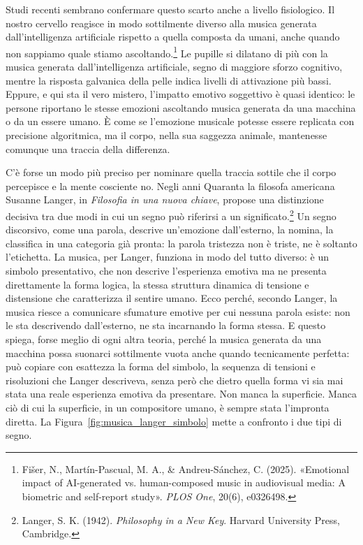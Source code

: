 Studi recenti sembrano confermare questo scarto anche a livello fisiologico. Il nostro cervello reagisce in modo sottilmente diverso alla musica generata dall'intelligenza artificiale rispetto a quella composta da umani, anche quando non sappiamo quale stiamo ascoltando.\footnote{Fi\v{s}er, N., Mart\'{i}n-Pascual, M. A., \& Andreu-S\'{a}nchez, C. (2025). «Emotional impact of AI-generated vs. human-composed music in audiovisual media: A biometric and self-report study». \textit{PLOS One}, 20(6), e0326498.} Le pupille si dilatano di pi\`{u} con la musica generata dall'intelligenza artificiale, segno di maggiore sforzo cognitivo, mentre la risposta galvanica della pelle indica livelli di attivazione pi\`{u} bassi. Eppure, e qui sta il vero mistero, l'impatto emotivo soggettivo \`{e} quasi identico: le persone riportano le stesse emozioni ascoltando musica generata da una macchina o da un essere umano. \`{E} come se l'emozione musicale potesse essere replicata con precisione algoritmica, ma il corpo, nella sua saggezza animale, mantenesse comunque una traccia della differenza.

C'\`{e} forse un modo pi\`{u} preciso per nominare quella traccia sottile che il corpo percepisce e la mente cosciente no. Negli anni Quaranta la filosofa americana Susanne Langer, in \textit{Filosofia in una nuova chiave}, propose una distinzione decisiva tra due modi in cui un segno pu\`{o} riferirsi a un significato.\footnote{Langer, S. K. (1942). \textit{Philosophy in a New Key}. Harvard University Press, Cambridge.} Un segno discorsivo, come una parola, descrive un'emozione dall'esterno, la nomina, la classifica in una categoria gi\`{a} pronta: la parola tristezza non \`{e} triste, ne \`{e} soltanto l'etichetta. La musica, per Langer, funziona in modo del tutto diverso: \`{e} un simbolo presentativo, che non descrive l'esperienza emotiva ma ne presenta direttamente la forma logica, la stessa struttura dinamica di tensione e distensione che caratterizza il sentire umano. Ecco perch\'{e}, secondo Langer, la musica riesce a comunicare sfumature emotive per cui nessuna parola esiste: non le sta descrivendo dall'esterno, ne sta incarnando la forma stessa. E questo spiega, forse meglio di ogni altra teoria, perch\'{e} la musica generata da una macchina possa suonarci sottilmente vuota anche quando tecnicamente perfetta: pu\`{o} copiare con esattezza la forma del simbolo, la sequenza di tensioni e risoluzioni che Langer descriveva, senza per\`{o} che dietro quella forma vi sia mai stata una reale esperienza emotiva da presentare. Non manca la superficie. Manca ci\`{o} di cui la superficie, in un compositore umano, \`{e} sempre stata l'impronta diretta. La Figura~\ref{fig:musica_langer_simbolo} mette a confronto i due tipi di segno.

